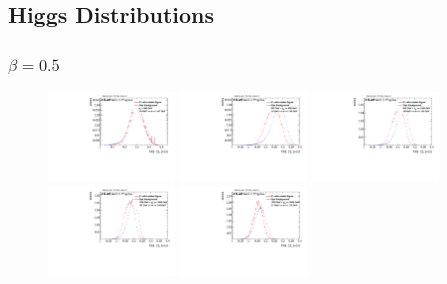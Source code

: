 \subsection{Higgs Distributions}
\subsubsection*{$\beta=0.5$}
\begin{figure}[H]
\includegraphics[width=0.3\textwidth]{sascha_input/Appendix/Distributions/higgs/distributions/beta05/h_assisted_tj_C2_05_bin1.pdf} \hspace{1mm}
\includegraphics[width=0.3\textwidth]{sascha_input/Appendix/Distributions/higgs/distributions/beta05/h_assisted_tj_C2_05_bin2.pdf} \hspace{4mm}
\includegraphics[width=0.3\textwidth]{sascha_input/Appendix/Distributions/higgs/distributions/beta05/h_assisted_tj_C2_05_bin3.pdf} 
\bigskip
\includegraphics[width=0.3\textwidth]{sascha_input/Appendix/Distributions/higgs/distributions/beta05/h_assisted_tj_C2_05_bin4.pdf} \hspace{4mm}
\includegraphics[width=0.3\textwidth]{sascha_input/Appendix/Distributions/higgs/distributions/beta05/h_assisted_tj_C2_05_bin5.pdf} 


\end{figure}
